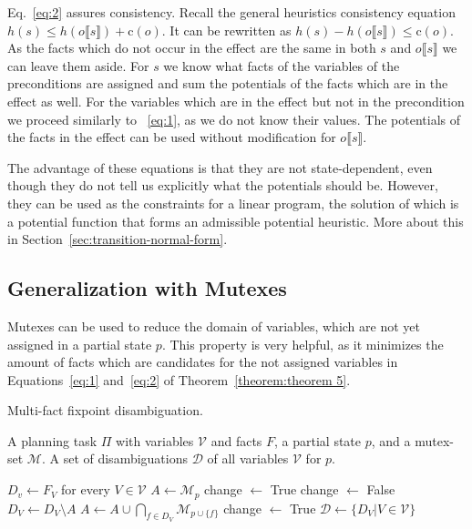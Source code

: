 Eq.~\eqref{eq:2} assures consistency.
Recall the general heuristics consistency equation $h(s)\leq h(o\llbracket s\rrbracket)+\text{c}(o)$.
It can be rewritten as $h(s)-h(o\llbracket s\rrbracket)\leq\text{c}(o)$.
As the facts which do not occur in the effect are the same in both $s$ and $o\llbracket s\rrbracket$ we can leave them aside. %
For $s$ we know what facts of the variables of the preconditions are assigned and sum the potentials of the facts which are in the effect as well.
For the variables which are in the effect but not in the precondition we proceed similarly to ~\eqref{eq:1}, as we do not know their values.
The potentials of the facts in the effect can be used without modification for  $o\llbracket s\rrbracket$.

The advantage of these equations is that they are not state-dependent, even though they do not tell us explicitly what the potentials should be.
However, they can be used as the constraints for a linear program, the solution of which is a potential function that forms an admissible potential heuristic.
More about this in Section~\ref{sec:transition-normal-form}.

\subsection{Generalization with Mutexes}\label{subsec:pot-generalize-with-mutexes}
Mutexes can be used to reduce the domain of variables, which are not yet assigned in a partial state $p$.
This property is very helpful, as it minimizes the amount of facts which are candidates for the not assigned variables in Equations~\eqref{eq:1} and~\eqref{eq:2} of Theorem~\ref{theorem:theorem 5}.

\begin{algorithm}[H]
    \caption{Multi-fact fixpoint disambiguation.}
    \label{alg:multi-fact}
    \begin{algorithmic}[1] %
        \Require A planning task $\Pi$ with variables $\mathcal{V}$ and facts $F$, a partial state $p$, and a mutex-set $\mathcal{M}$.
        \Ensure A set of disambiguations $\mathcal{D}$ of all variables $\mathcal{V}$ for $p$.

        \State $D_v\leftarrow F_V$ for every $V\in\mathcal{V}$\;
        \State $A\leftarrow \mathcal{M}_p$\;
        \State change $\leftarrow$ True\;
        \State change $\leftarrow$ False\;
        \State $D_V\leftarrow D_V\setminus A$\;
        \State $A\leftarrow A\cup \bigcap_{f\in D_V}\mathcal{M}_{p\cup \{f\}} $\; \label{lst:line:A}
        \State change $\leftarrow$ True\;
        \EndIf
        \EndFor
        \EndWhile
        \State $\mathcal{D}\leftarrow\{D_V|V\in\mathcal{V}\}$\;
    \end{algorithmic}
\end{algorithm}

